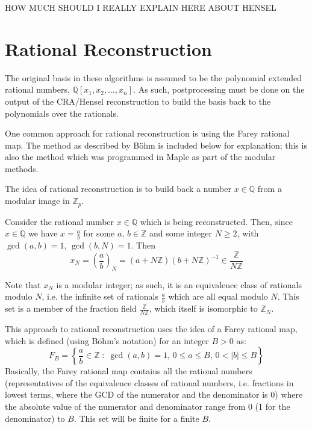 \documentclass[letterpaper,12pt,titlepage,oneside,final]{book}
\begin{document}
HOW MUCH SHOULD I REALLY EXPLAIN HERE ABOUT HENSEL  

\section{Rational Reconstruction}

The original basis in these algorithms is assumed to be the polynomial extended rational numbers, ${\mathbb{Q}[x_1, x_2, \ldots, x_n]}$.  As such, postprocessing must be done on the output of the CRA/Hensel reconstruction to build the basis back to the polynomials over the rationals.  

One common approach for rational reconstruction is using the Farey rational map.  The method as described by B\"ohm is included below for explanation; this is also the method which was programmed in Maple as part of the modular methods.

The idea of rational reconstruction is to build back a number ${x \in \mathbb{Q}}$ from a modular image in ${\mathbb{Z}_p}$. 

Consider the rational number ${x \in \mathbb{Q}}$ which is being reconstructed.  Then, since ${x \in \mathbb{Q}}$ we have ${x = \frac{a}{b}}$ for some ${a,\,b \in \mathbb{Z}}$ and some integer ${N \geq 2}$, with ${\gcd(a, b) = 1,\, \gcd(b, N) = 1}$.
Then
\begin{equation*}
  x_N = \left(\frac{a}{b}\right)_N = (a + N\mathbb{Z})(b + N\mathbb{Z})^{-1} \in \frac{\mathbb{Z}}{N\mathbb{Z}}
\end{equation*}   

Note that ${x_N}$ is a modular integer; as such, it is an equivalence class of rationals modulo ${N}$, i.e. the infinite set of rationals ${\frac{a}{b}}$ which are all equal modulo ${N}$.  This set is a member of the fraction field ${\frac{\mathbb{Z}}{N\mathbb{Z}}}$, which itself is isomorphic to ${\mathbb{Z}_N}$.

This approach to rational reconstruction uses the idea of a Farey rational map, which is defined (using B\"ohm's notation) for an integer ${B > 0}$ as:
\begin{equation*}
  F_B = \left\{\frac{a}{b} \in \mathbb{Z}\; : \; \gcd(a, b) = 1,\, 0 \leq a \leq B,\, 0 < |b| \leq B\right\}
\end{equation*}
Basically, the Farey rational map contains all the rational numbers (representatives of the equivalence classes of rational numbers, i.e. fractions in lowest terms, where the GCD of the numerator and the denominator is 0) where the absolute value of the numerator and denominator range from 0 (1 for the denominator) to ${B}$.  This set will be finite for a finite ${B}$.
\end{document}
